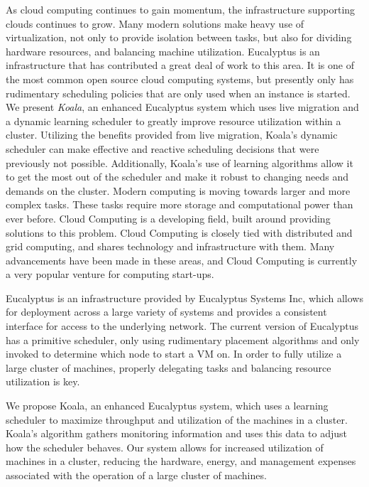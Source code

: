  \begin{Introduction}
As cloud computing continues to gain momentum, the infrastructure supporting
clouds continues to grow.  Many modern solutions make heavy use of
virtualization, not only to provide isolation between tasks, but also for
dividing hardware resources, and balancing machine utilization.  Eucalyptus is
an infrastructure that has contributed a great deal of work to this area.  It is
one of the most common open source cloud computing systems, but presently only
has rudimentary scheduling policies that are only used when an instance is
started.  We present \emph{Koala}, an enhanced Eucalyptus system which uses live 
migration and a dynamic learning scheduler to greatly improve resource utilization within a cluster.  Utilizing the benefits provided from live migration, Koala's dynamic scheduler can make effective and reactive scheduling decisions that were previously not possible.  Additionally, Koala's use of learning algorithms allow it to get the most out of the scheduler and make it robust to changing needs and demands on the cluster.
  Modern computing is moving towards larger and more complex tasks.  These tasks require more storage and computational power than ever before.  Cloud Computing is a developing field, built around providing solutions to this problem.  Cloud Computing is closely tied with distributed and grid computing, and shares technology and infrastructure with them.  Many advancements have been made in these areas, and Cloud Computing is currently a very popular venture for computing start-ups.

  Eucalyptus is an infrastructure provided by Eucalyptus Systems Inc, which allows for deployment across a large variety of systems and provides a consistent interface for access to the underlying network.  The current version of Eucalyptus has a primitive scheduler, only using rudimentary placement algorithms and only invoked to determine which node to start a VM on.  In order to fully utilize a large cluster of machines, properly delegating tasks and balancing resource utilization is key.

  We propose Koala, an enhanced Eucalyptus system, which uses a learning scheduler to maximize throughput and utilization of the machines in a cluster.  Koala's algorithm gathers monitoring information and uses this data to adjust how the scheduler behaves.  Our system allows for increased utilization of machines in a cluster, reducing the hardware, energy, and management expenses associated with the operation of a large cluster of machines.


\end{Introduction}
